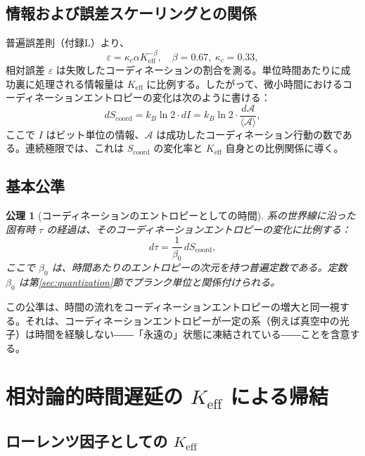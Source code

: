 \documentclass[12pt,a4paper]{article}
\newtheorem{axiom}[theorem]{公理}
\newcommand{\Keff}{K_{\mathrm{eff}}}
\newcommand{\kappac}{\kappa_c}
\newcommand{\Scoord}{S_{\mathrm{coord}}}
\begin{document}
	\subsection{情報および誤差スケーリングとの関係}
	
	普遍誤差則（付録L）より、
	\begin{equation}
		\varepsilon = \kappac \alpha \Keff^{-\beta}, \quad \beta = 0.67,\ \kappac = 0.33,
	\end{equation}
	相対誤差 \(\varepsilon\) は失敗したコーディネーションの割合を測る。単位時間あたりに成功裏に処理される情報量は \(\Keff\) に比例する。したがって、微小時間におけるコーディネーションエントロピーの変化は次のように書ける：
	\begin{equation}
		d\Scoord = k_B \ln 2 \cdot dI = k_B \ln 2 \cdot \frac{d\mathcal{A}}{\langle \mathcal{A} \rangle},
	\end{equation}
	ここで \(I\) はビット単位の情報、\(\mathcal{A}\) は成功したコーディネーション行動の数である。連続極限では、これは \(\Scoord\) の変化率と \(\Keff\) 自身との比例関係に導く。
	
	\subsection{基本公準}
	
	\begin{axiom}[コーディネーションのエントロピーとしての時間]
		系の世界線に沿った固有時 \(\tau\) の経過は、そのコーディネーションエントロピーの変化に比例する：
		\begin{equation}
			d\tau = \frac{1}{\beta_0} \, d\Scoord,
			\label{eq:time_entropy}
		\end{equation}
		ここで \(\beta_0\) は、時間あたりのエントロピーの次元を持つ普遍定数である。定数 \(\beta_0\) は第\ref{sec:quantization}節でプランク単位と関係付けられる。
	\end{axiom}
	
	この公準は、時間の流れをコーディネーションエントロピーの増大と同一視する。それは、コーディネーションエントロピーが一定の系（例えば真空中の光子）は時間を経験しない――「永遠の」状態に凍結されている――ことを含意する。
	
	\section{相対論的時間遅延の \(\Keff\) による帰結}
	\label{sec:sr}
	
	\subsection{ローレンツ因子としての \(\Keff\)}
	
\end{document}
